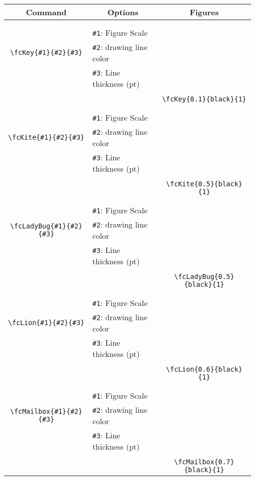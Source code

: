\documentclass{article}
\begin{document}
\begin{table}[H]\centering\begin{tabular}{|c|l|c|}\hline {\bf Command}& \multicolumn{1}{c|}{{\bf Options}} & {\bf Figures}\\  \hline	&&\multirow{5}{*}{\fcKey{0.1}{black}{1}}\\	&&\\	&\verb|#1|: Figure Scale &\\	\verb|\fcKey{#1}{#2}{#3}|&	\verb|#2|: drawing line color &\\	&\verb|#3|: Line thickness (pt) &\\ &&\\&&	\verb|\fcKey{0.1}{black}{1}|\\\hline 	
	&&\multirow{5}{*}{\fcKite{0.5}{black}{1}}\\	&&\\	&\verb|#1|: Figure Scale &\\	\verb|\fcKite{#1}{#2}{#3}|&	\verb|#2|: drawing line color &\\	&\verb|#3|: Line thickness (pt) &\\ &&\\&&	\verb|\fcKite{0.5}{black}{1}|\\\hline 	
	&&\multirow{5}{*}{\fcLadyBug{0.5}{black}{1}}\\	&&\\	&\verb|#1|: Figure Scale &\\	\verb|\fcLadyBug{#1}{#2}{#3}|&	\verb|#2|: drawing line color &\\	&\verb|#3|: Line thickness (pt) &\\ &&\\&&	\verb|\fcLadyBug{0.5}{black}{1}|\\\hline 	
	&&\multirow{5}{*}{\fcLion{0.6}{black}{1}}\\	&&\\	&\verb|#1|: Figure Scale &\\	\verb|\fcLion{#1}{#2}{#3}|&	\verb|#2|: drawing line color &\\	&\verb|#3|: Line thickness (pt) &\\ &&\\&&	\verb|\fcLion{0.6}{black}{1}|\\\hline 	
	&&\multirow{5}{*}{\fcMailbox{0.7}{black}{1}}\\	&&\\	&\verb|#1|: Figure Scale &\\	\verb|\fcMailbox{#1}{#2}{#3}|&	\verb|#2|: drawing line color &\\	&\verb|#3|: Line thickness (pt) &\\ &&\\&&	\verb|\fcMailbox{0.7}{black}{1}|\\\hline 	

\end{tabular}
\end{table}
\end{document}
